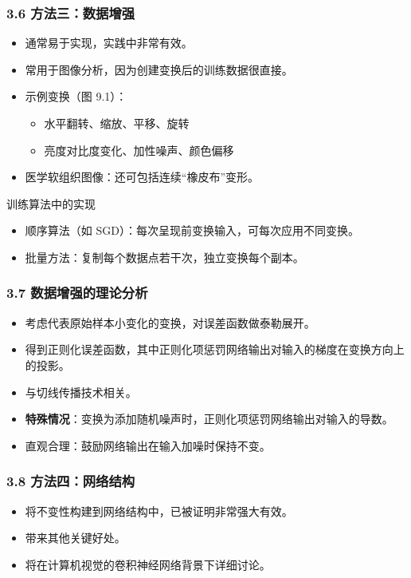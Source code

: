 \documentclass[t,aspectratio=169]{beamer} %
\begin{document}
\begin{frame}
    \frametitle{3.6 方法三：数据增强}
    \begin{itemize}
        \item 通常\alert{易于实现}，实践中非常有效。
        \item 常用于图像分析，因为创建变换后的训练数据很直接。
        \item 示例变换（图 9.1）：
        \begin{itemize}
            \item 水平翻转、缩放、平移、旋转
            \item 亮度对比度变化、加性噪声、颜色偏移
        \end{itemize}
        \item 医学软组织图像：还可包括连续\alert{“橡皮布”变形}。
    \end{itemize}
    \begin{block}{训练算法中的实现}
        \begin{itemize}
            \item \alert{顺序算法}（如 SGD）：每次呈现前变换输入，可每次应用不同变换。
            \item \alert{批量方法}：复制每个数据点若干次，独立变换每个副本。
        \end{itemize}
    \end{block}
\end{frame}

\begin{frame}
    \frametitle{3.7 数据增强的理论分析}
    \begin{itemize}
        \item 考虑代表原始样本小变化的变换，对误差函数做\alert{泰勒展开}。
        \item 得到正则化误差函数，其中正则化项惩罚网络输出对输入的梯度在\alert{变换方向上的投影}。
        \item 与切线传播技术相关。
        \item \textbf{特殊情况}：变换为添加随机噪声时，正则化项惩罚网络输出对输入的导数。
        \item 直观合理：鼓励网络输出在输入加噪时保持不变。
    \end{itemize}
\end{frame}

\begin{frame}
    \frametitle{3.8 方法四：网络结构}
    \begin{itemize}
        \item 将不变性构建到网络结构中，已被证明\alert{非常强大有效}。
        \item 带来其他关键好处。
        \item 将在计算机视觉的\alert{卷积神经网络}背景下详细讨论。
    \end{itemize}
\end{frame}
\end{document}
